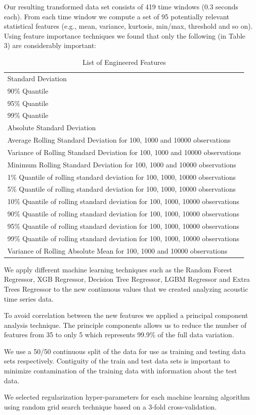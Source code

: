 \documentclass[]{llncs} %
\begin{document}
Our resulting transformed data set consists of 419 time windows (0.3 seconds each).  From each time window we compute a set of 95 potentially relevant statistical features (e.g., mean, variance, kurtosis, min/max, threshold and so on). Using feature importance techniques we found that only the following (in Table 3) are considerably important:
\begin{table}[H]
	\begin{center}
		\caption{List of Engineered Features}
		\label{tab:engineeredFeatrures}
		\begin{tabular}{l} 
Standard Deviation \\
90\% Quantile \\
95\% Quantile \\
99\% Quantile \\
Absolute Standard Deviation \\
Average Rolling Standard Deviation for 100, 1000 and 10000 observations \\
Variance of Rolling Standard Deviation for 100, 1000 and 10000 observations \\
Minimum Rolling Standard Deviation for 100, 1000 and 10000 observations \\
1\% Quantile of rolling standard deviation for 100, 1000, 10000 observations \\
5\% Quantile of rolling standard deviation for 100, 1000, 10000 observations \\
10\% Quantile of rolling standard deviation for 100, 1000, 10000 observations \\
90\% Quantile of rolling standard deviation for 100, 1000, 10000 observations \\
95\% Quantile of rolling standard deviation for 100, 1000, 10000 observations \\
99\% Quantile of rolling standard deviation for 100, 1000, 10000 observations \\
Variance of Rolling Absolute Mean for 100, 1000 and 10000 observations \\
		\end{tabular}
	\end{center}
\end{table}

We apply different machine learning techniques such as the Random Forest Regressor, XGB Regressor,  Decision Tree Regressor, LGBM Regressor and Extra Trees Regressor to the new continuous values that we created analyzing acoustic time series data. \par
To avoid correlation between the new features we applied a principal component analysis technique. The principle components allows us to reduce the number of features from 35 to only 5 which represents 99.9\% of the full data variation. \par
We use a 50/50 continuous split of the data for use as training and testing data sets respectively. Contiguity of the train and test data sets is important to minimize contamination of the training data with information about the test data. \par
We selected regularization hyper-parameters for each machine learning algorithm using random grid search technique based on a 3-fold cross-validation.
\end{document}
